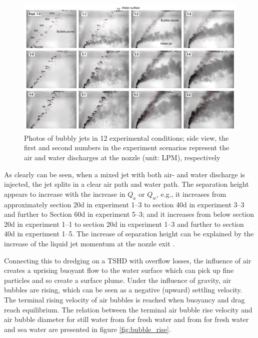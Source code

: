 \begin{figure}[ht!]
    \centering
    \includegraphics[width = 1\textwidth]{Images/Zhang_experiment_2.png}
    \caption{Photos of bubbly jets in 12 experimental conditions; side view, the first and second numbers in the experiment scenarios represent the air and water discharges at the nozzle (unit: LPM), respectively}
    \label{fig:Zhang_experiment_2}
\end{figure}
\newpage
\noindent As clearly can be seen, when a mixed jet with both air- and water discharge is injected, the jet splits in a clear air path and water path. The separation height appears to increase with the increase in $Q_a$ or $Q_w$, e.g., it increases from approximately section 20d in experiment 1–3 to section 40d in experiment 3–3 and further to Section 60d in experiment 5–3; and it increases from below section 20d in experiment 1–1 to section 20d in experiment 1–3 and further to section 40d in experiment 1–5. The increase of separation height can be explained by the increase of the liquid jet momentum at the nozzle exit \citep{Zhang+}. \newline

\noindent Connecting this to dredging on a TSHD with overflow losses, the influence of air creates a uprising buoyant flow to the water surface which can pick up fine particles and so create a surface plume. Under the influence of gravity, air bubbles are rising, which can be seen as a negative (upward) settling velocity. The terminal rising velocity of air bubbles is reached when buoyancy and drag reach equilibrium. The relation between the terminal air bubble rise velocity and air bubble diameter for still water from \cite{Clift+} for fresh water and from \cite{Chanson+} for fresh water and sea water are presented in figure \ref{fig:bubble_rise}.

